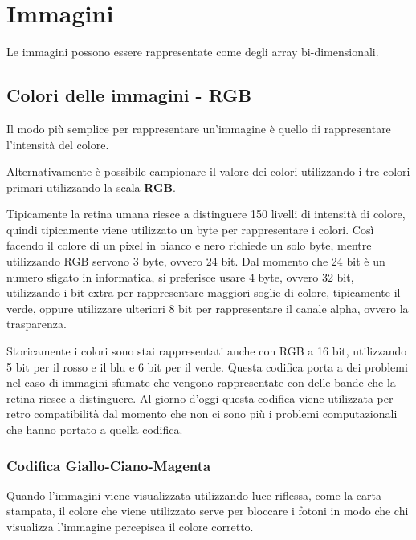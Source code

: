 \chapter{Immagini}\label{lezione-2---immagini}

Le immagini possono essere rappresentate come degli array
bi-dimensionali.

\section{Colori delle immagini - RGB}\label{colori-delle-immagini---rgb}

Il modo più semplice per rappresentare un'immagine è quello di rappresentare l'intensità del colore.

Alternativamente è possibile campionare il valore dei colori utilizzando i tre colori primari utilizzando la scala \textbf{RGB}.

Tipicamente la retina umana riesce a distinguere 150 livelli di intensità di colore, quindi tipicamente viene utilizzato un byte per
rappresentare i colori. Così facendo il colore di un pixel in bianco e
nero richiede un solo byte, mentre utilizzando RGB servono 3 byte,
ovvero 24 bit. Dal momento che 24 bit è un numero sfigato in
informatica, si preferisce usare 4 byte, ovvero 32 bit, utilizzando i
bit extra per rappresentare maggiori soglie di colore, tipicamente il
verde, oppure utilizzare ulteriori 8 bit per rappresentare il canale
alpha, ovvero la trasparenza.

Storicamente i colori sono stai rappresentati anche con RGB a 16 bit,
utilizzando 5 bit per il rosso e il blu e 6 bit per il verde. Questa
codifica porta a dei problemi nel caso di immagini sfumate che vengono
rappresentate con delle bande che la retina riesce a distinguere. Al
giorno d'oggi questa codifica viene utilizzata per retro compatibilità
dal momento che non ci sono più i problemi computazionali che hanno
portato a quella codifica.

\subsection{Codifica Giallo-Ciano-Magenta}\label{codifica-giallo-ciano-magenta}

Quando l'immagini viene visualizzata utilizzando luce riflessa, come la
carta stampata, il colore che viene utilizzato serve per bloccare i
fotoni in modo che chi visualizza l'immagine percepisca il colore
corretto.

